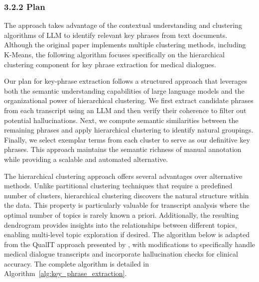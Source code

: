 \documentclass[11pt,a4paper]{article}
\begin{document}
\subsubsection*{3.2.2 Plan} 
The \cite{kapoor2024qualitativeinsightstoolqualit} approach takes advantage of the contextual understanding and clustering algorithms of LLM to identify relevant key phrases from text documents. Although the original paper implements multiple clustering methods, including K-Means, the following algorithm focuses specifically on the hierarchical clustering component for key phrase extraction for medical dialogues.

Our plan for key-phrase extraction follows a structured approach that leverages both the semantic understanding capabilities of large language models and the organizational power of hierarchical clustering. We first extract candidate phrases from each transcript using an LLM and then verify their coherence to filter out potential hallucinations. Next, we compute semantic similarities between the remaining phrases and apply hierarchical clustering to identify natural groupings. Finally, we select exemplar terms from each cluster to serve as our definitive key phrases. This approach maintains the semantic richness of manual annotation while providing a scalable and automated alternative.

The hierarchical clustering approach offers several advantages over alternative methods. 
Unlike partitional clustering techniques that require a predefined number of clusters, hierarchical clustering discovers the natural structure within the data. 
This property is particularly valuable for transcript analysis where the optimal number of topics is rarely known a priori. 
Additionally, the resulting dendrogram provides insights into the relationships between different topics, enabling multi-level topic exploration if desired.
The algorithm below is adapted from the QualIT approach presented by  \cite{kapoor2024qualitativeinsightstoolqualit}, with modifications to specifically handle medical dialogue transcripts and incorporate hallucination checks for clinical accuracy. The complete algorithm is detailed in Algorithm~\ref{alg:key_phrase_extraction}.
\end{document}
